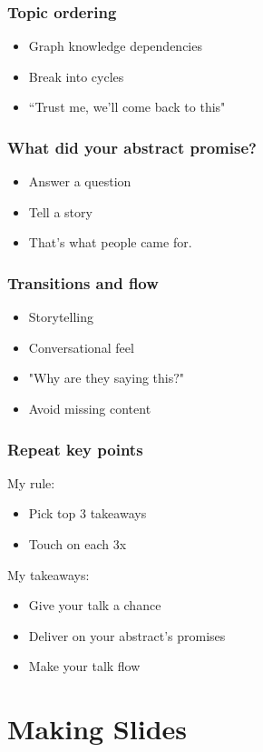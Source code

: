 \documentclass{beamer}
\begin{document}
\begin{frame}[fragile]
\frametitle{Topic ordering}
\begin{itemize}[<+(1)->]
\item Graph knowledge dependencies
\item Break into cycles
\item ``Trust me, we'll come back to this"
\end{itemize}
\end{frame}

\begin{frame}[fragile]
\frametitle{What did your abstract promise?}
\begin{itemize}[<+(1)->]
\item Answer a question
\item Tell a story
\item That's what people came for.
\end{itemize}
\end{frame}

\begin{frame}[fragile]
\frametitle{Transitions and flow}
\begin{itemize}[<+(1)->]
\item Storytelling
\item Conversational feel
\item "Why are they saying this$?$"
\item Avoid missing content
\end{itemize}
\end{frame}


\begin{frame}[fragile]
\frametitle{Repeat key points}
My rule:
\begin{itemize}
\item Pick top 3 takeaways
\item Touch on each 3x
\end{itemize}
My takeaways:
\begin{itemize}[<+(1)->]
\item Give your talk a chance
\item Deliver on your abstract's promises
\item Make your talk flow
\end{itemize}
\end{frame}

\section{Making Slides}
\end{document}
